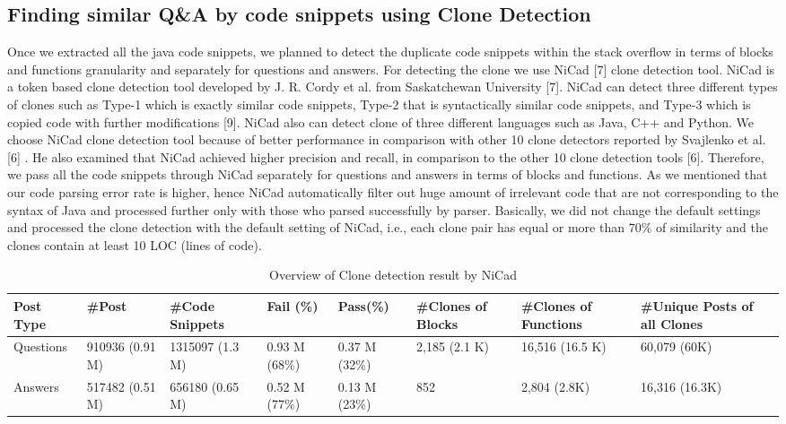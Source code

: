 \documentclass[conference]{IEEEtran}
\begin{document}
	\subsection{Finding similar Q\&A by code snippets using Clone Detection}
	Once we extracted all the java code snippets, we planned to detect the duplicate code snippets within the stack overflow in terms of blocks and functions granularity and separately for questions and answers. For detecting the clone we use NiCad [7] clone detection tool. NiCad is a token based clone detection tool developed by  J. R. Cordy et al. from  Saskatchewan University [7].  NiCad can detect three different types of clones such as Type-1 which is exactly similar code snippets, Type-2 that is syntactically similar code snippets, and Type-3 which is copied code with further modifications [9]. NiCad also can detect clone of three different languages such as Java, C++ and Python. We choose NiCad clone detection tool because of better performance in comparison with other 10 clone detectors reported by Svajlenko et al. [6] . He also examined that NiCad achieved higher precision and recall, in comparison to the other 10 clone detection tools [6]. Therefore, we pass all the code snippets through NiCad separately for questions and answers in terms of blocks and functions. As we mentioned that our code parsing error rate is higher, hence NiCad automatically filter out huge amount of irrelevant code that are not corresponding to the syntax of Java and processed further only with those who parsed successfully by parser. Basically, we did not change the default settings and processed the clone detection with the default setting of NiCad, i.e., each clone pair has equal or more than 70\% of similarity and the clones contain at least 10 LOC (lines of code). 
	
	\begin{table*}[ht]
		\caption{Overview of Clone detection result by NiCad}
		\centering
		\begin{tabular}{l l l l l l l l }
			\hline\hline
			Post Type & \#Post & \#Code Snippets & Fail (\%)  & Pass(\%) & \#Clones of Blocks & \#Clones of Functions & \#Unique Posts of all Clones \\
			\hline
			Questions & 910936 (0.91 M) & 1315097 (1.3 M) & 0.93 M (68\%) & 0.37 M (32\%) & 2,185 (2.1 K) &  16,516 (16.5 K) & 60,079 (60K) \\
		    Answers & 517482 (0.51 M) & 656180 (0.65 M) & 0.52 M (77\%) & 0.13 M (23\%)& 852 & 2,804 (2.8K) & 16,316 (16.3K)  \\
			\hline
		\end{tabular}
		\label{table:NicadResult}
	\end{table*}
	
\end{document}
